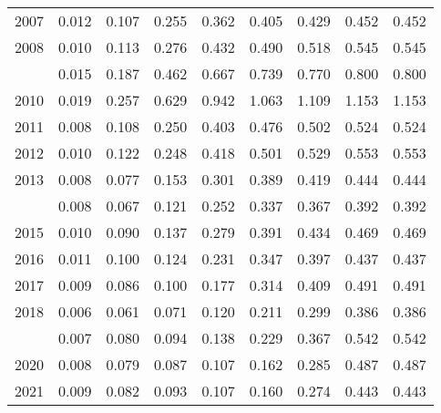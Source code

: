 \documentclass[
]{article}
\begin{document}
\begin{longtable}[t]{lrrrrrrrr}
2007 & 0.012 & 0.107 & 0.255 & 0.362 & 0.405 & 0.429 & 0.452 & 0.452\\
2008 & 0.010 & 0.113 & 0.276 & 0.432 & 0.490 & 0.518 & 0.545 & 0.545\\
\addlinespace
2009 & 0.015 & 0.187 & 0.462 & 0.667 & 0.739 & 0.770 & 0.800 & 0.800\\
2010 & 0.019 & 0.257 & 0.629 & 0.942 & 1.063 & 1.109 & 1.153 & 1.153\\
2011 & 0.008 & 0.108 & 0.250 & 0.403 & 0.476 & 0.502 & 0.524 & 0.524\\
2012 & 0.010 & 0.122 & 0.248 & 0.418 & 0.501 & 0.529 & 0.553 & 0.553\\
2013 & 0.008 & 0.077 & 0.153 & 0.301 & 0.389 & 0.419 & 0.444 & 0.444\\
\addlinespace
2014 & 0.008 & 0.067 & 0.121 & 0.252 & 0.337 & 0.367 & 0.392 & 0.392\\
2015 & 0.010 & 0.090 & 0.137 & 0.279 & 0.391 & 0.434 & 0.469 & 0.469\\
2016 & 0.011 & 0.100 & 0.124 & 0.231 & 0.347 & 0.397 & 0.437 & 0.437\\
2017 & 0.009 & 0.086 & 0.100 & 0.177 & 0.314 & 0.409 & 0.491 & 0.491\\
2018 & 0.006 & 0.061 & 0.071 & 0.120 & 0.211 & 0.299 & 0.386 & 0.386\\
\addlinespace
2019 & 0.007 & 0.080 & 0.094 & 0.138 & 0.229 & 0.367 & 0.542 & 0.542\\
2020 & 0.008 & 0.079 & 0.087 & 0.107 & 0.162 & 0.285 & 0.487 & 0.487\\
2021 & 0.009 & 0.082 & 0.093 & 0.107 & 0.160 & 0.274 & 0.443 & 0.443\\*
\end{longtable}
\end{document}
